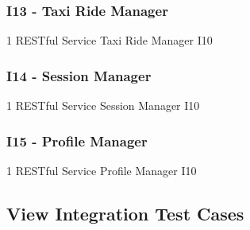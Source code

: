 \subsubsection{I13 - Taxi Ride Manager}
\testCaseSimpleSimple
	{1}
	{RESTful Service}
	{Taxi Ride Manager}
	{I10}
\subsubsection{I14 - Session Manager}
\testCaseSimpleSimple
	{1}
	{RESTful Service}
	{Session Manager}
	{I10}
\subsubsection{I15 - Profile Manager}
\testCaseSimpleSimple
	{1}
	{RESTful Service}
	{Profile Manager}
	{I10}
\subsection{View Integration Test Cases}
